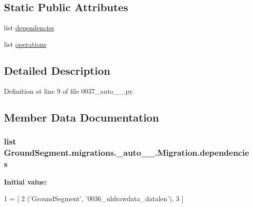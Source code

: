\subsection*{Static Public Attributes}
\begin{DoxyCompactItemize}
\item 
list \hyperlink{class_ground_segment_1_1migrations_1_10037__auto__20170131__1727_1_1_migration_a5cc556b3523fe1128d727268869c6947}{dependencies}
\item 
list \hyperlink{class_ground_segment_1_1migrations_1_10037__auto__20170131__1727_1_1_migration_a56e08d3bb9b43a4b0b341454ebc73ff4}{operations}
\end{DoxyCompactItemize}


\subsection{Detailed Description}


Definition at line 9 of file 0037\+\_\+auto\+\_\+\_.\+py.



\subsection{Member Data Documentation}
\hypertarget{class_ground_segment_1_1migrations_1_10037__auto__20170131__1727_1_1_migration_a5cc556b3523fe1128d727268869c6947}{}
\subsubsection[{dependencies}]{\setlength{\rightskip}{0pt plus 5cm}list Ground\+Segment.\+migrations.\+\_\+auto\+\_\+\_.\+Migration.\+dependencies\hspace{0.3cm}{\ttfamily [static]}}\label{class_ground_segment_1_1migrations_1_10037__auto__20170131__1727_1_1_migration_a5cc556b3523fe1128d727268869c6947}
{\bfseries Initial value\+:}
\begin{DoxyCode}
1 = [
2         (\textcolor{stringliteral}{'GroundSegment'}, \textcolor{stringliteral}{'0036\_uhfrawdata\_datalen'}),
3     ]
\end{DoxyCode}


